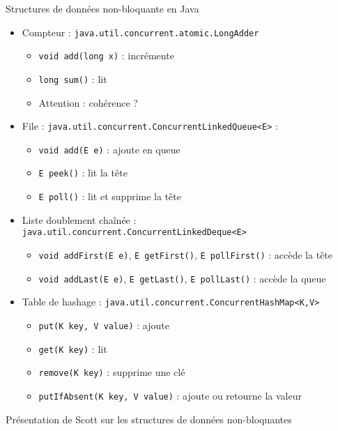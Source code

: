 
\begingroup

\begin{frame}{Structures de données non-bloquante en Java}
  \begin{itemize}
  \item Compteur : \lstinline{java.util.concurrent.atomic.LongAdder}
    \begin{itemize}
    \item \lstinline{void add(long x)} : incrémente
    \item \lstinline{long sum()} : lit
    \item \alert{Attention : cohérence ?}
    \end{itemize}
  \item File : \lstinline{java.util.concurrent.ConcurrentLinkedQueue<E>} :
    \begin{itemize}
    \item \lstinline{void add(E e)} : ajoute en queue
    \item \lstinline{E peek()} : lit la tête
    \item \lstinline{E poll()} : lit et supprime la tête
    \end{itemize}
  \item Liste doublement chaînée : \lstinline{java.util.concurrent.ConcurrentLinkedDeque<E>}
    \begin{itemize}
    \item \lstinline{void addFirst(E e)}, \lstinline{E getFirst()}, \lstinline{E pollFirst()} : accède la tête
    \item \lstinline{void addLast(E e)}, \lstinline{E getLast()}, \lstinline{E pollLast()} : accède la queue
    \end{itemize}
  \item Table de hashage : \lstinline{java.util.concurrent.ConcurrentHashMap<K,V>}
    \begin{itemize}
    \item \lstinline{put(K key, V value)} : ajoute
    \item \lstinline{get(K key)} : lit
    \item \lstinline{remove(K key)} : supprime une clé
    \item \lstinline{putIfAbsent(K key, V value)} : ajoute ou retourne la valeur
    \end{itemize}
  \end{itemize}
  \begin{citing}
  \item Présentation de Scott sur les structures de données non-bloquantes
  \end{citing}
\end{frame}

\endgroup
\endinput
